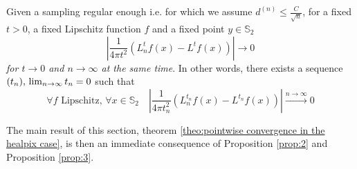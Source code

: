 \vspace{0.5cm}
\begin{prop}\label{prop:2}
	Given a sampling regular enough i.e. for which we assume $d^{(n)}\leq \frac{C}{\sqrt{n}}$, for a fixed $t>0$, a fixed Lipschitz function $f$ and a fixed point $y\in\mathbb S_2$
$$\left|\frac{1}{4\pi t^2}\left(L_n^tf(x) -L^tf(x)\right)\right|\rightarrow0$$
\textit{for $t\to0$ and $n\to\infty$ at the same time}. In other words, there exists a sequence $(t_n), \\ \lim_{n\to\infty}t_n=0$ such that 
$$\forall f \text{ Lipschitz, } \forall x\in\mathbb S_2 \quad \left|\frac{1}{4\pi t_n^2}\left(L_n^{t_n}f(x) - L^{t_n}f(x)\right)\right|\xrightarrow{n\to \infty}0$$
\end{prop}
\vspace{0.5cm}

The main result of this section, theorem  \ref{theo:pointwise convergence in the healpix case}, is then an immediate consequence of Proposition \ref{prop:2} and Proposition \ref{prop:3}.


